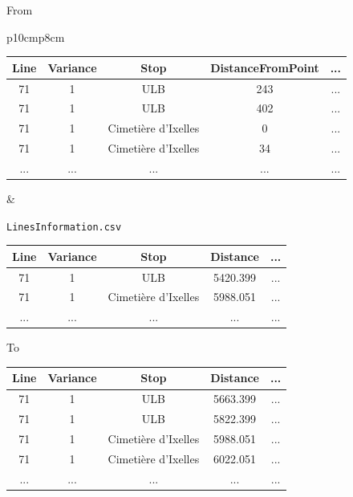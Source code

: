 \documentclass{article}
\begin{document}
\begin{center}
From
\end{center}
\begin{tabular}{p{10cm}p{8cm}}
\begin{center}
\small
\begin{tabular}{|c|c|c|c|c|} 
 \hline
 Line & Variance & Stop & DistanceFromPoint & ...\\ [0.5ex]
 \hline\hline
 71 & 1 & ULB & 243 & ... \\ 
 \hline
 71 & 1 & ULB & 402 & ... \\
 \hline
 71 & 1 & Cimetière d'Ixelles & 0 & ... \\
 \hline
 71 & 1 & Cimetière d'Ixelles & 34 & ... \\
 \hline
 ... & ... & ... & ... & ... \\
 \hline
\end{tabular}
\end{center}

&

\begin{center}
\scriptsize
\texttt{LinesInformation.csv}
\begin{tabular}{|c|c|c|c|c|} 
 \hline
 Line & Variance & Stop & Distance & ...\\ [0.5ex]
 \hline\hline
 71 & 1 & ULB & 5420.399 & ... \\ 
 \hline
 71 & 1 & Cimetière d'Ixelles & 5988.051 & ... \\
 \hline
 ... & ... & ... & ... & ... \\
 \hline
\end{tabular}
\end{center}

\end{tabular}

\begin{center}
To
\end{center}

\begin{center}
\begin{tabular}{|c|c|c|c|c|} 
 \hline
 Line & Variance & Stop & Distance & ...\\ [0.5ex]
 \hline\hline
 71 & 1 & ULB & 5663.399 & ... \\ 
 \hline
 71 & 1 & ULB & 5822.399 & ... \\
 \hline
 71 & 1 & Cimetière d'Ixelles & 5988.051 & ... \\
 \hline
 71 & 1 & Cimetière d'Ixelles & 6022.051 & ... \\
 \hline
 ... & ... & ... & ... & ... \\
 \hline
\end{tabular}
\end{center}
\end{document}
